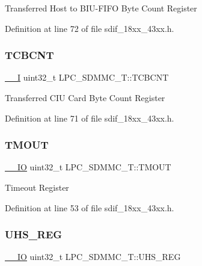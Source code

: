 Transferred Host to B\+I\+U-\/\+F\+I\+FO Byte Count Register 

Definition at line 72 of file sdif\+\_\+18xx\+\_\+43xx.\+h.

\mbox{\label{struct_l_p_c___s_d_m_m_c___t_a07c77ca70a78e8a1341742afed786af1}} 
\subsubsection{\texorpdfstring{T\+C\+B\+C\+NT}{TCBCNT}}
{\footnotesize\ttfamily \hyperlink{core__sc300_8h_af63697ed9952cc71e1225efe205f6cd3}{\+\_\+\+\_\+I} uint32\+\_\+t L\+P\+C\+\_\+\+S\+D\+M\+M\+C\+\_\+\+T\+::\+T\+C\+B\+C\+NT}

Transferred C\+IU Card Byte Count Register 

Definition at line 71 of file sdif\+\_\+18xx\+\_\+43xx.\+h.

\mbox{\label{struct_l_p_c___s_d_m_m_c___t_a50ffd2ff08194cbaafdfe96a58a813df}} 
\subsubsection{\texorpdfstring{T\+M\+O\+UT}{TMOUT}}
{\footnotesize\ttfamily \hyperlink{core__sc300_8h_aec43007d9998a0a0e01faede4133d6be}{\+\_\+\+\_\+\+IO} uint32\+\_\+t L\+P\+C\+\_\+\+S\+D\+M\+M\+C\+\_\+\+T\+::\+T\+M\+O\+UT}

Timeout Register 

Definition at line 53 of file sdif\+\_\+18xx\+\_\+43xx.\+h.

\mbox{\label{struct_l_p_c___s_d_m_m_c___t_a205f9feb5039bd83958cc7de2e237444}} 
\subsubsection{\texorpdfstring{U\+H\+S\+\_\+\+R\+EG}{UHS\_REG}}
{\footnotesize\ttfamily \hyperlink{core__sc300_8h_aec43007d9998a0a0e01faede4133d6be}{\+\_\+\+\_\+\+IO} uint32\+\_\+t L\+P\+C\+\_\+\+S\+D\+M\+M\+C\+\_\+\+T\+::\+U\+H\+S\+\_\+\+R\+EG}

